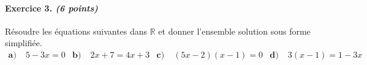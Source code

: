 \documentclass[11pt]{article}
\begin{document}
\paragraph{Exercice 3. \emph{(6 points)}} Résoudre les équations suivantes dans $\mathbb{R}$ et
donner l'ensemble solution sous forme simplifiée.
\begin{align*}
  \textbf{a)}\; & 5-3x = 0 &
  \textbf{b)}\; & 2x+7 = 4x+3 &
  \textbf{c)}\; & (5x-2)(x-1) = 0 &
  \textbf{d)}\; & 3(x-1) = 1-3x &
\end{align*}
\end{document}
